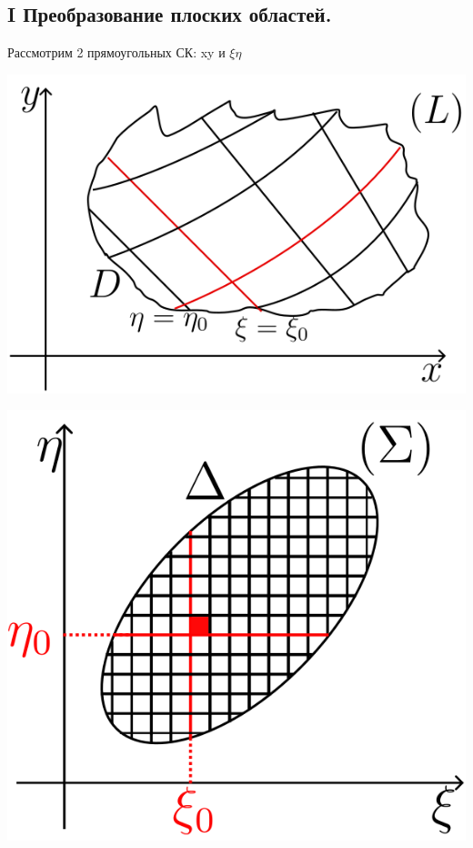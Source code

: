 \documentclass[12pt]{article}
\let\ORIincludegraphics\includegraphics
\renewcommand{\includegraphics}[2][]{\ORIincludegraphics[scale=0.65,#1]{#2}}
\begin{document}
  \subsection*{I Преобразование плоских областей.}
  Рассмотрим 2 прямоугольных СК: xy и $\xi \eta$\\
  \begin{minipage}{0.5\textwidth}
    \includegraphics[scale=0.8]{8.16.1.png}
  \end{minipage}
  \hspace{1em}
  \begin{minipage}{0.5\textwidth}
    \includegraphics[scale=0.7]{8.16.2.png}
  \end{minipage}
\end{document}
